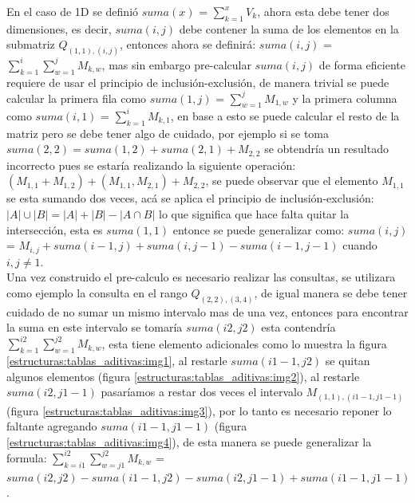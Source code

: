 \documentclass[12pt, a4paper]{article}
\begin{document}
	En el caso de 1D se definió $suma(x)$ = $\sum_{k=1}^{x} V_{k}$, ahora esta debe tener dos dimensiones, es decir, 
	$suma(i,j)$ debe contener la suma de los elementos en la submatriz $Q_{(1,1),(i,j)}$, entonces ahora se definirá:
	$suma(i,j)$ = $\sum_{k=1}^{i} \sum_{w=1}^{j} M_{k,w}$, mas sin embargo pre-calcular $suma(i,j)$ de forma eficiente
	requiere de usar el principio de inclusión-exclusión, de manera trivial se puede calcular la primera fila como
	$suma(1,j)$ = $\sum_{w=1}^{j} M_{1,w}$ y la primera columna como $suma(i,1)$ = $\sum_{k=1}^{i} M_{k,1}$, en base
	a esto se puede calcular el resto de la matriz pero se debe tener algo de cuidado, por ejemplo si se toma 
	$suma(2,2) = suma(1,2) + suma(2,1) + M_{2,2}$ se obtendría un resultado incorrecto pues se estaría realizando la
	siguiente operación: $(M_{1,1}+M_{1,2}) + (M_{1,1},M_{2,1}) + M_{2,2}$, se puede observar que el elemento 
	$M_{1,1}$ se esta sumando dos veces, acá se aplica el principio de inclusión-exclusión: 
	$|A| \cup |B| = |A| + |B| - |A \cap B|$ lo que significa que hace falta quitar la intersección, esta es 
	$suma(1,1)$ entonce se puede generalizar como: $suma(i,j)$ = $M_{i,j} + suma(i-1,j) + suma(i,j-1) - suma(i-1,j-1)$
	cuando $i,j \neq 1$.\\
	
	Una vez construido el pre-calculo es necesario realizar las consultas, se utilizara como ejemplo la consulta en
	el rango $Q_{(2,2),(3,4)}$, de igual manera se debe tener cuidado de no sumar un mismo intervalo mas de una vez,
	entonces para encontrar la suma en este intervalo se tomaría $suma(i2,j2)$ esta contendría 
	$\sum_{k=1}^{i2} \sum_{w=1}^{j2} M_{k,w}$, esta tiene elemento adicionales como lo muestra la figura 
	\ref{estructuras:tablas_aditivas:img1}, al restarle $suma(i1-1,j2)$ se quitan algunos elementos 
	(figura \ref{estructuras:tablas_aditivas:img2}), al restarle $suma(i2,j1-1)$ pasaríamos a restar dos veces el intervalo 
	$M_{(1,1),(i1-1,j1-1)}$ (figura \ref{estructuras:tablas_aditivas:img3}), por lo tanto es necesario reponer lo faltante agregando
	$suma(i1-1,j1-1)$ (figura \ref{estructuras:tablas_aditivas:img4}), de esta manera se puede generalizar la formula: 
	$\sum_{k=i1}^{i2} \sum_{w=j1}^{j2} M_{k,w}$ = $suma(i2,j2)-suma(i1-1,j2)-suma(i2,j1-1)+suma(i1-1,j1-1)$.
\end{document}
